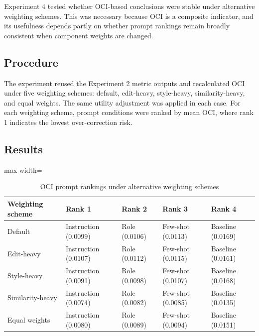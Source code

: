 Experiment 4 tested whether OCI-based conclusions were stable under alternative weighting schemes. This was necessary because OCI is a composite indicator, and its usefulness depends partly on whether prompt rankings remain broadly consistent when component weights are changed.

\subsection{Procedure}

The experiment reused the Experiment 2 metric outputs and recalculated OCI under five weighting schemes: default, edit-heavy, style-heavy, similarity-heavy, and equal weights. The same utility adjustment was applied in each case. For each weighting scheme, prompt conditions were ranked by mean OCI, where rank 1 indicates the lowest over-correction risk.

\subsection{Results}

\begin{table}[htbp]
    \centering
    \caption{OCI prompt rankings under alternative weighting schemes}
    \label{tab:exp4_oci_robustness}
    \renewcommand{\arraystretch}{1.15}
    \begin{adjustbox}{max width=\textwidth}
    \begin{tabular}{lllll}
        \toprule
        \textbf{Weighting scheme} & \textbf{Rank 1} & \textbf{Rank 2} & \textbf{Rank 3} & \textbf{Rank 4} \\
        \midrule
        Default           & Instruction (0.0099) & Role (0.0106) & Few-shot (0.0113) & Baseline (0.0169) \\
        Edit-heavy        & Instruction (0.0107) & Role (0.0112) & Few-shot (0.0115) & Baseline (0.0161) \\
        Style-heavy       & Instruction (0.0091) & Role (0.0098) & Few-shot (0.0107) & Baseline (0.0168) \\
        Similarity-heavy  & Instruction (0.0074) & Role (0.0082) & Few-shot (0.0085) & Baseline (0.0135) \\
        Equal weights     & Instruction (0.0080) & Role (0.0089) & Few-shot (0.0094) & Baseline (0.0151) \\
        \bottomrule
    \end{tabular}
    \end{adjustbox}
\end{table}

